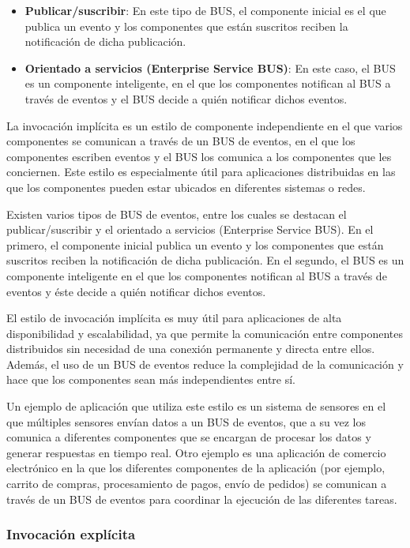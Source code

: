 \documentclass[executivepaper]{article}
\begin{document}
\begin{itemize}
\item \textbf{Publicar/suscribir}: En este tipo de BUS, el componente inicial es el que publica un evento y los componentes que están suscritos reciben la notificación de dicha publicación.
\item \textbf{Orientado a servicios (Enterprise Service BUS)}: En este caso, el BUS es un componente inteligente, en el que los componentes notifican al BUS a través de eventos y el BUS decide a quién notificar dichos eventos.
\end{itemize}

La invocación implícita es un estilo de componente independiente en el que varios componentes se comunican a través de un BUS de eventos, en el que los componentes escriben eventos y el BUS los comunica a los componentes que les conciernen. Este estilo es especialmente útil para aplicaciones distribuidas en las que los componentes pueden estar ubicados en diferentes sistemas o redes.

Existen varios tipos de BUS de eventos, entre los cuales se destacan el publicar/suscribir y el orientado a servicios (Enterprise Service BUS). En el primero, el componente inicial publica un evento y los componentes que están suscritos reciben la notificación de dicha publicación. En el segundo, el BUS es un componente inteligente en el que los componentes notifican al BUS a través de eventos y éste decide a quién notificar dichos eventos.

El estilo de invocación implícita es muy útil para aplicaciones de alta disponibilidad y escalabilidad, ya que permite la comunicación entre componentes distribuidos sin necesidad de una conexión permanente y directa entre ellos. Además, el uso de un BUS de eventos reduce la complejidad de la comunicación y hace que los componentes sean más independientes entre sí.

Un ejemplo de aplicación que utiliza este estilo es un sistema de sensores en el que múltiples sensores envían datos a un BUS de eventos, que a su vez los comunica a diferentes componentes que se encargan de procesar los datos y generar respuestas en tiempo real. Otro ejemplo es una aplicación de comercio electrónico en la que los diferentes componentes de la aplicación (por ejemplo, carrito de compras, procesamiento de pagos, envío de pedidos) se comunican a través de un BUS de eventos para coordinar la ejecución de las diferentes tareas.

\subsubsection*{Invocación explícita}
\end{document}
